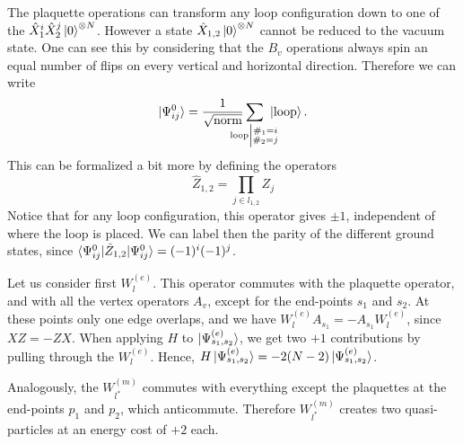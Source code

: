 \documentclass[a4paper,10pt,twoside]{article}
\theoremstyle{modern}
\begin{document}
\begin{section}{}
The plaquette operations can transform any loop configuration down to one of the $\hat{X}_1^i \hat{X}_2^j \ket{0}^{\otimes N}$.
However a state $\hat{X}_{1,2}\ket{0}^{\otimes N}$ cannot be reduced to the vacuum state.
One can see this by considering that the $B_v$ operations always spin an equal number of flips on every vertical and horizontal direction.
Therefore we can write 
\[
  \ket{\Psi_{ij}^0} = \frac{1}{\sqrt{\rm norm}}\sum_{\mathclap{{\rm loop} \left| \substack{\#_1 = i \\ \#_2 = j } \right. }}  \ \ket{\rm loop} .
\]
This can be formalized a bit more by defining the operators
\[
  \hat{Z}_{1,2} = \prod_{j \in l_{1,2}} Z_j
\]
Notice that for any loop configuration, this operator gives $\pm 1$, independent of where the loop is placed.
We can label then the parity of the different ground states, since $ \braket{\Psi_{ij}^0 | \hat{Z}_{1,2} | \Psi_{ij}^0} = (-1)^i (-1)^j$.
\end{section}

\begin{section}{}
Let us consider first $W_l^{(e)}$.
This operator commutes with the plaquette operator, and with all the vertex operators $A_v$, except for the end-points $s_1$ and $s_2$.
At these points only one edge overlaps, and we have $W_l^{(e)} A_{s_1} = - A_{s_1} W_l^{(e)}$, since $XZ = -ZX$.
When applying $H$ to $\ket{\Psi_{s_1,s_2}^{(e)}}$, we get two $+1$ contributions by pulling through the $W_l^{(e)}$.
Hence, $H\ket{\Psi_{s_1,s_2}^{(e)}} = -2(N-2)\ket{\Psi_{s_1,s_2}^{(e)}}$.

Analogously, the $W_{l^*}^{(m)}$ commutes with everything except the plaquettes at the end-points $p_1$ and $p_2$, which anticommute.
Therefore $W_{l^*}^{(m)}$ creates two quasi-particles at an energy cost of $+2$ each.
\end{section}
\end{document}
